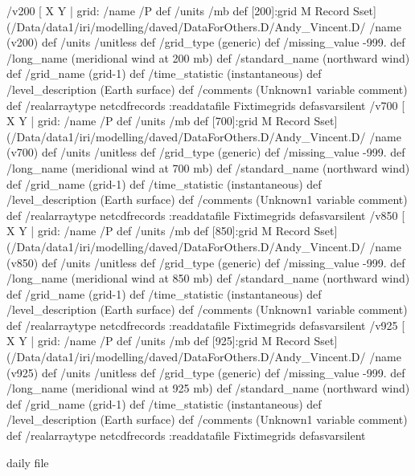 \begin{ingrid}
 /v200{
[  X Y | grid:
       /name /P def
       /units /mb def
       [200]:grid M Record Sset] (/Data/data1/iri/modelling/daved/DataForOthers.D/Andy_Vincent.D/%
/name (v200) def
 /units /unitless def
 /grid_type (generic) def
 /missing_value -999. def
 /long_name (meridional wind at 200 mb) def
/standard_name (northward wind) def
 /grid_name (grid-1) def
 /time_statistic (instantaneous) def
 /level_description (Earth surface) def
 /comments (Unknown1 variable comment) def
 /realarraytype netcdfrecords :readdatafile Fixtimegrids
}defasvarsilent
 /v700{
[  X Y | grid:
       /name /P def
       /units /mb def
       [700]:grid M Record Sset] (/Data/data1/iri/modelling/daved/DataForOthers.D/Andy_Vincent.D/%
/name (v700) def
 /units /unitless def
 /grid_type (generic) def
 /missing_value -999. def
 /long_name (meridional wind at 700 mb) def
/standard_name (northward wind) def /grid_name (grid-1) def
 /time_statistic (instantaneous) def
 /level_description (Earth surface) def
 /comments (Unknown1 variable comment) def
 /realarraytype netcdfrecords :readdatafile Fixtimegrids
}defasvarsilent
 /v850{
[  X Y | grid:
       /name /P def
       /units /mb def
       [850]:grid M Record Sset] (/Data/data1/iri/modelling/daved/DataForOthers.D/Andy_Vincent.D/%
/name (v850) def
 /units /unitless def
 /grid_type (generic) def
 /missing_value -999. def
 /long_name (meridional wind at 850 mb) def
/standard_name (northward wind) def /grid_name (grid-1) def
 /time_statistic (instantaneous) def
 /level_description (Earth surface) def
 /comments (Unknown1 variable comment) def
 /realarraytype netcdfrecords :readdatafile Fixtimegrids
}defasvarsilent
 /v925{
[  X Y | grid:
       /name /P def
       /units /mb def
       [925]:grid M Record Sset] (/Data/data1/iri/modelling/daved/DataForOthers.D/Andy_Vincent.D/%
/name (v925) def
 /units /unitless def
 /grid_type (generic) def
 /missing_value -999. def
 /long_name (meridional wind at 925 mb) def
/standard_name (northward wind) def /grid_name (grid-1) def
 /time_statistic (instantaneous) def
 /level_description (Earth surface) def
 /comments (Unknown1 variable comment) def
 /realarraytype netcdfrecords :readdatafile Fixtimegrids
}defasvarsilent
\end{ingrid}
daily file

